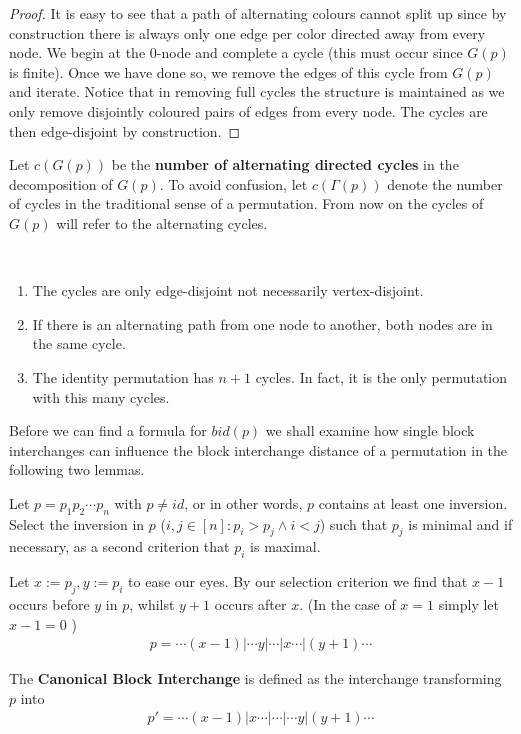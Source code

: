 \begin{proof}
It is easy to see that a path of alternating colours cannot split up since by construction there is always only one edge per color directed away from every node. We begin at the $0$-node and complete a cycle (this must occur since $G(p)$ is finite). Once we have done so, we remove the edges of this cycle from $G(p)$ and iterate. Notice that in removing full cycles the structure is maintained as we only remove disjointly coloured pairs of edges from every node. The cycles are then edge-disjoint by construction.
\end{proof}

\begin{definition}
Let $c(G(p))$ be the \textbf{number of alternating directed cycles} in the decomposition of $G(p)$. To avoid confusion, let $c(\Gamma (p))$ denote the number of cycles in the traditional sense of a permutation. From now on the cycles of $G(p)$ will refer to the alternating cycles.
\end{definition}

\begin{remark} ~ %
\begin{enumerate}
\item The cycles are only edge-disjoint not necessarily vertex-disjoint.
\item If there is an alternating path from one node to another, both nodes are in the same cycle.
\item The identity permutation has $n+1$ cycles. In fact, it is the only permutation with this many cycles.
\end{enumerate}
\end{remark}

Before we can find a formula for $bid(p)$ we shall examine how single block interchanges can influence the block interchange distance of a permutation in the following two lemmas.

\begin{definition} Let $p = p_1 p_2 \cdots p_n $ with $ p \neq id $, or in other words, $p$ contains at least one inversion. Select the inversion in $p$ ($ i,j \in [ n ] : p_i > p_j \wedge i < j$) such that $p_j$ is minimal and if necessary, as a second criterion that $p_i$ is maximal. 

Let $x := p_j , y := p_i$ to ease our eyes. By our selection criterion we find that $x-1$ occurs before $y$ in $p$, whilst $y+1$ occurs after $x$. (In the case of $x =1$ simply let $x-1=0$ )
\begin{align*}
p = \cdots (x-1) | \cdots y | \cdots | x \cdots | (y+1) \cdots
\end{align*}

The \textbf{Canonical Block Interchange} is defined as the interchange transforming $p$ into
\begin{align*}
p' = \cdots (x-1) | x \cdots | \cdots | \cdots y | (y+1) \cdots
\end{align*}

\end{definition}

